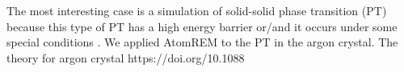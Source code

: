 \documentclass[preprint,12pt]{elsarticle}
\begin{document}
The most interesting case is a simulation of solid-solid phase transition (PT) because this type of PT has a high energy barrier or/and it occurs under some special conditions \cite{Iron_bcc_hcp_fcc}. We applied AtomREM to the PT in the argon crystal. The theory for argon crystal https://doi.org/10.1088%

\end{document}
